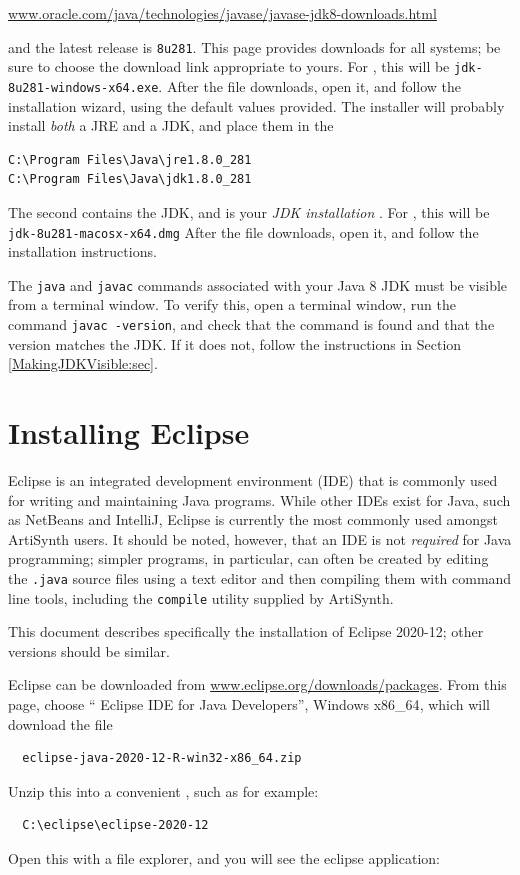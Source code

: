 \href{https://www.oracle.com/java/technologies/javase/javase-jdk8-downloads.html}%
{www.oracle.com/java/technologies/javase/javase-jdk8-downloads.html}

and the latest release is {\tt 8u281}. This page provides downloads
for all systems; be sure to choose the download link appropriate to
yours.
\ifWindows
For \SYSTEM{}, this will be {\tt jdk-8u281-windows-x64.exe}.  After
the file downloads, open it, and follow the installation wizard, using
the default values provided. The installer will probably install {\it
both} a JRE and a JDK, and place them in the \directories{}
\begin{verbatim}
C:\Program Files\Java\jre1.8.0_281
C:\Program Files\Java\jdk1.8.0_281
\end{verbatim}
The second contains the JDK, and is your {\it JDK installation} \directory{}.
\fi
\ifMacOS
For \SYSTEM{}, this will be {\tt jdk-8u281-macosx-x64.dmg}
After the file downloads, open it, and follow the installation instructions.
\fi

The {\tt java} and {\tt javac} commands associated with your Java 8
JDK must be visible from a terminal window. To verify this, open a
terminal window, run the command {\tt javac
-version}, and check that the command is found and that the version
matches the JDK.  If it does not, follow the instructions in Section
\ref{MakingJDKVisible:sec}.

\section{Installing Eclipse}

Eclipse is an integrated development environment (IDE) that is
commonly used for writing and maintaining Java programs. While other
IDEs exist for Java, such as NetBeans and IntelliJ, Eclipse is
currently the most commonly used amongst ArtiSynth users. It should be
noted, however, that an IDE is not {\it required} for Java
programming; simpler programs, in particular, can often be created by
editing the {\tt .java} source files using a text editor and then
compiling them with command line tools, including the {\tt compile}
utility supplied by ArtiSynth.

This document describes specifically the installation of Eclipse
2020-12; other versions should be similar.

Eclipse can be downloaded from
\href{https://www.eclipse.org/downloads/packages}%
{www.eclipse.org/downloads/packages}. From this page, choose ``{\sf
Eclipse IDE for Java Developers}'',
\ifWindows
{\sf Windows x86\_64}, which will download the file
\begin{verbatim}
  eclipse-java-2020-12-R-win32-x86_64.zip
\end{verbatim}
Unzip this into a convenient \directory{}, such as for example:
\begin{verbatim}
  C:\eclipse\eclipse-2020-12
\end{verbatim}
Open this \directory{}with a file explorer, and you will see the eclipse
application:

